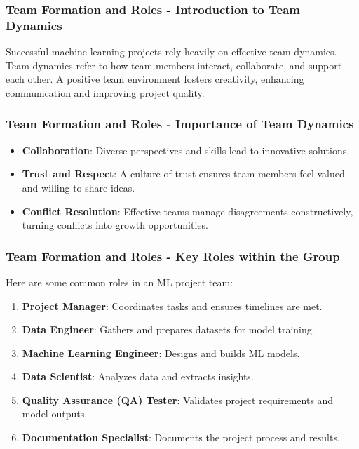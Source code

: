 \documentclass[aspectratio=169]{beamer}
\begin{document}
\begin{frame}[fragile]
    \frametitle{Team Formation and Roles - Introduction to Team Dynamics}
    Successful machine learning projects rely heavily on effective team dynamics. 
    Team dynamics refer to how team members interact, collaborate, and support each other. 
    A positive team environment fosters creativity, enhancing communication and improving project quality.
\end{frame}

\begin{frame}[fragile]
    \frametitle{Team Formation and Roles - Importance of Team Dynamics}
    \begin{itemize}
        \item \textbf{Collaboration}: Diverse perspectives and skills lead to innovative solutions.
        \item \textbf{Trust and Respect}: A culture of trust ensures team members feel valued and willing to share ideas.
        \item \textbf{Conflict Resolution}: Effective teams manage disagreements constructively, turning conflicts into growth opportunities.
    \end{itemize}
\end{frame}

\begin{frame}[fragile]
    \frametitle{Team Formation and Roles - Key Roles within the Group}
    Here are some common roles in an ML project team:
    \begin{enumerate}
        \item \textbf{Project Manager}: Coordinates tasks and ensures timelines are met. 
        \item \textbf{Data Engineer}: Gathers and prepares datasets for model training.
        \item \textbf{Machine Learning Engineer}: Designs and builds ML models.
        \item \textbf{Data Scientist}: Analyzes data and extracts insights.
        \item \textbf{Quality Assurance (QA) Tester}: Validates project requirements and model outputs.
        \item \textbf{Documentation Specialist}: Documents the project process and results.
    \end{enumerate}
\end{frame}
\end{document}
